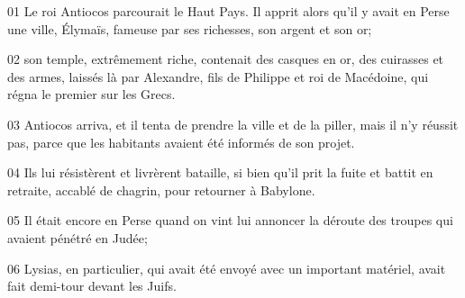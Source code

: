 01 Le roi Antiocos parcourait le Haut Pays. Il apprit alors qu’il y avait en Perse une ville, Élymaïs, fameuse par ses richesses, son argent et son or;

02 son temple, extrêmement riche, contenait des casques en or, des cuirasses et des armes, laissés là par Alexandre, fils de Philippe et roi de Macédoine, qui régna le premier sur les Grecs.

03 Antiocos arriva, et il tenta de prendre la ville et de la piller, mais il n’y réussit pas, parce que les habitants avaient été informés de son projet.

04 Ils lui résistèrent et livrèrent bataille, si bien qu’il prit la fuite et battit en retraite, accablé de chagrin, pour retourner à Babylone.

05 Il était encore en Perse quand on vint lui annoncer la déroute des troupes qui avaient pénétré en Judée;

06 Lysias, en particulier, qui avait été envoyé avec un important matériel, avait fait demi-tour devant les Juifs.